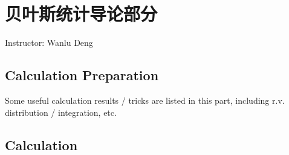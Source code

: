 \section{贝叶斯统计导论部分}
\begin{center}
    Instructor: Wanlu Deng
\end{center}
\newcommand{\fixed}[1]{\underline{#1}}

\subsection{Calculation Preparation}
Some useful calculation results / tricks are listed in this part, including r.v. distribution / integration, etc.

\subsection{Calculation}
